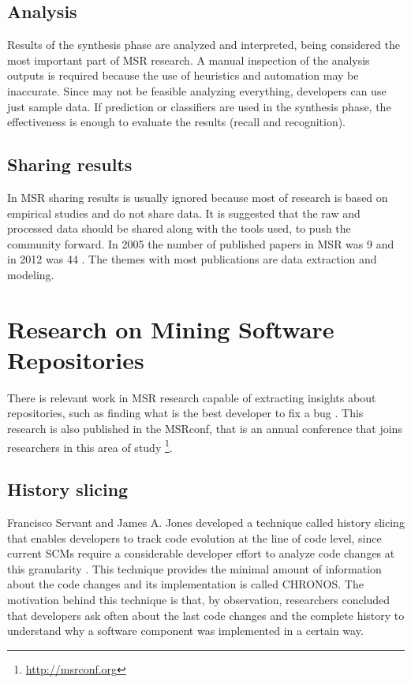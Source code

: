 \subsection{Analysis}
Results of the synthesis phase are analyzed and interpreted, being considered the most important part of MSR research. A manual inspection of the analysis outputs is required because the use of heuristics and automation may be inaccurate. Since may not be feasible analyzing everything, developers can use just sample data. If prediction or classifiers are used in the synthesis phase, the effectiveness is enough to evaluate the results (recall and recognition). 

\subsection{Sharing results}
In MSR sharing results is usually ignored because most of research is based on empirical studies and do not share data. It is suggested that the raw and processed data should be shared along with the tools used, to push the community forward. In 2005 the number of published papers in MSR was 9 and in 2012 was 44 \cite{Hemmati2013}. The themes with most publications are data extraction and modeling.


\section{Research on Mining Software Repositories}
There is relevant work in MSR research capable of extracting insights about repositories, such as finding what is the best developer to fix a bug \cite{Servant1}. This research is also published in the MSRconf, that is an annual conference that joins researchers in this area of study \footnote{\url{http://msrconf.org}}.

\subsection{History slicing}
Francisco Servant and James A. Jones developed a technique called history slicing that enables developers to track code evolution at the line of code level, since current SCMs require a considerable developer effort to analyze code changes at this granularity \cite{Servant}. 
This technique provides the minimal amount of information about the code changes and its implementation is called CHRONOS. The motivation behind this technique is that, by observation, researchers concluded that developers ask often about the last code changes and the complete history to understand why a software component was implemented in a certain way.

